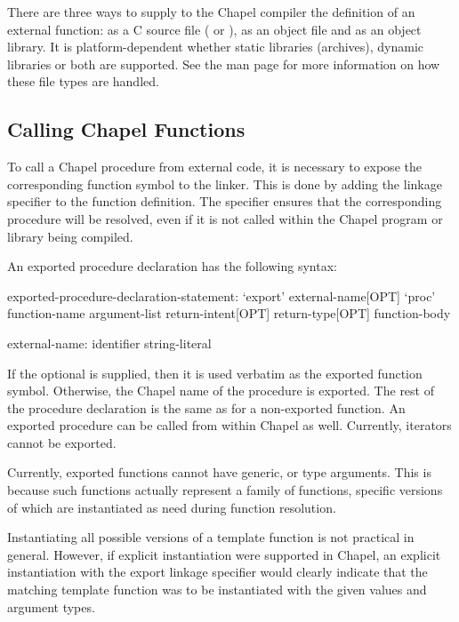 There are three ways to supply to the Chapel compiler the definition of an
external function: as a C source file ( or ), as an object
file and as an object library.  It is platform-dependent whether static
libraries (archives), dynamic libraries or both are supported.  See
the  man page for more information on how these file types are handled.

\subsection{Calling Chapel Functions}
\label{Calling_Chapel_Functions}

To call a Chapel procedure from external code, it is necessary to expose the
corresponding function symbol to the linker.  This is done by adding
the  linkage specifier to the function definition.
The  specifier ensures that the corresponding procedure will be
resolved, even if it is not called within the Chapel program or library being
compiled.

An exported procedure declaration has the following syntax:
\begin{syntax}
exported-procedure-declaration-statement:
  `export' external-name[OPT] `proc' function-name argument-list return-intent[OPT] return-type[OPT]
    function-body

external-name:
  identifier
  string-literal
\end{syntax}

If the optional  is
supplied, then it is used verbatim as the exported function symbol.  Otherwise,
the Chapel name of the procedure is exported.  The rest of the procedure
declaration is the same as for a non-exported function.  An exported procedure can be
called from within Chapel as well.  Currently, iterators cannot be exported.

\begin{future}
Currently, exported functions cannot have generic,  or type arguments.
This is because such functions actually represent a family of functions,
specific versions of which are instantiated as need during function resolution.

Instantiating all possible versions of a template function is not
practical in general.  However, if explicit instantiation were supported in
Chapel, an explicit instantiation with the export linkage specifier would
clearly indicate that the matching template function was to be instantiated with
the given  values and argument types.
\end{future}


